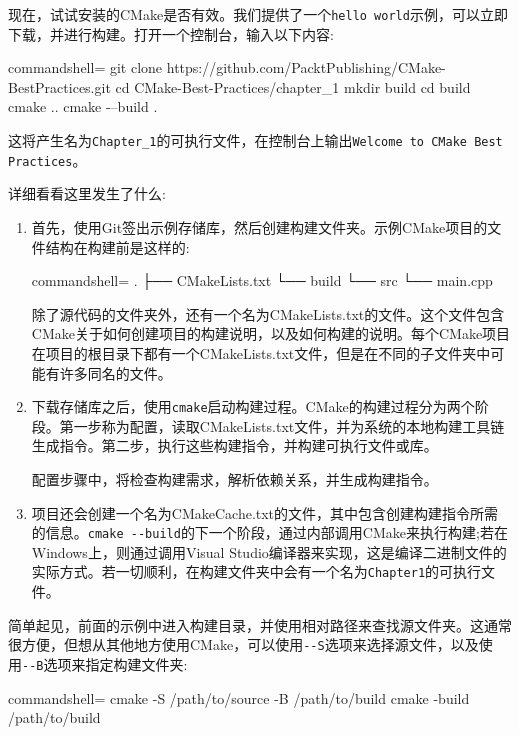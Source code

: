 现在，试试安装的CMake是否有效。我们提供了一个\texttt{hello world}示例，可以立即下载，并进行构建。打开一个控制台，输入以下内容:

\begin{tcblisting}{commandshell={}}
git clone https://github.com/PacktPublishing/CMake-BestPractices.git
cd CMake-Best-Practices/chapter_1
mkdir build
cd build
cmake ..
cmake -–build .
\end{tcblisting}

这将产生名为\texttt{Chapter\_1}的可执行文件，在控制台上输出\texttt{Welcome to CMake Best Practices}。

详细看看这里发生了什么:

\begin{enumerate}
\item 
首先，使用Git签出示例存储库，然后创建构建文件夹。示例CMake项目的文件结构在构建前是这样的:

\begin{tcblisting}{commandshell={}}
.
├── CMakeLists.txt
└── build
└── src
      └── main.cpp
\end{tcblisting}

除了源代码的文件夹外，还有一个名为CMakeLists.txt的文件。这个文件包含CMake关于如何创建项目的构建说明，以及如何构建的说明。每个CMake项目在项目的根目录下都有一个CMakeLists.txt文件，但是在不同的子文件夹中可能有许多同名的文件。

\item 
下载存储库之后，使用\texttt{cmake}启动构建过程。CMake的构建过程分为两个阶段。第一步称为配置，读取CMakeLists.txt文件，并为系统的本地构建工具链生成指令。第二步，执行这些构建指令，并构建可执行文件或库。

配置步骤中，将检查构建需求，解析依赖关系，并生成构建指令。

\item 
项目还会创建一个名为CMakeCache.txt的文件，其中包含创建构建指令所需的信息。\texttt{cmake -{}-build}的下一个阶段，通过内部调用CMake来执行构建;若在Windows上，则通过调用Visual Studio编译器来实现，这是编译二进制文件的实际方式。若一切顺利，在构建文件夹中会有一个名为\texttt{Chapter1}的可执行文件。
\end{enumerate}

简单起见，前面的示例中进入构建目录，并使用相对路径来查找源文件夹。这通常很方便，但想从其他地方使用CMake，可以使用\texttt{-{}-S}选项来选择源文件，以及使用\texttt{-{}-B}选项来指定构建文件夹:

\begin{tcblisting}{commandshell={}}
cmake -S /path/to/source -B /path/to/build
cmake -build /path/to/build
\end{tcblisting}

